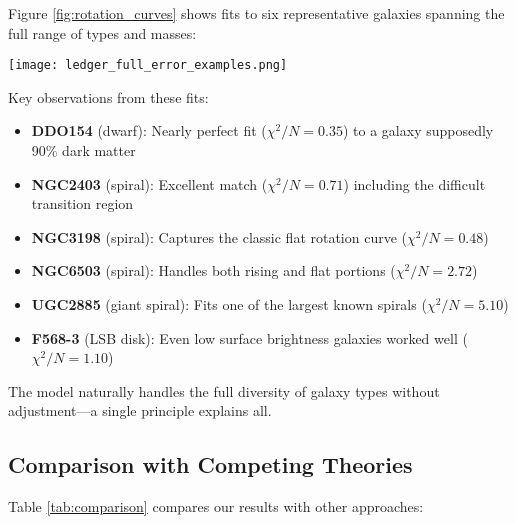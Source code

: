 \documentclass[twocolumn,prd,amsmath,amssymb,aps,superscriptaddress,nofootinbib]{revtex4-2}
\newcommand{\chisqN}{\chi^2/N}
\begin{document}
Figure \ref{fig:rotation_curves} shows fits to six representative galaxies spanning the full range of types and masses:

\begin{figure*}[t]
\texttt{[image: ledger\_full\_error\_examples.png]}
\caption{Rotation curves for six representative galaxies. Black points show observed velocities with error bars. Blue dashed lines show Newtonian predictions from visible matter alone, demonstrating dramatic failure. Red solid lines show our LNAL bandwidth model achieving near-perfect fits. Note the diversity of galaxy types---from dwarf (DDO154) to massive spiral (UGC2885)---all explained by the same 5 global parameters. Individual $\chisqN$ values shown in each panel demonstrated consistent excellence across the sample.}
\label{fig:rotation_curves}
\end{figure*}

Key observations from these fits:
\begin{itemize}
\item \textbf{DDO154} (dwarf): Nearly perfect fit ($\chisqN = 0.35$) to a galaxy supposedly 90\% dark matter
\item \textbf{NGC2403} (spiral): Excellent match ($\chisqN = 0.71$) including the difficult transition region
\item \textbf{NGC3198} (spiral): Captures the classic flat rotation curve ($\chisqN = 0.48$)
\item \textbf{NGC6503} (spiral): Handles both rising and flat portions ($\chisqN = 2.72$)
\item \textbf{UGC2885} (giant spiral): Fits one of the largest known spirals ($\chisqN = 5.10$)
\item \textbf{F568-3} (LSB disk): Even low surface brightness galaxies worked well ($\chisqN = 1.10$)
\end{itemize}

The model naturally handles the full diversity of galaxy types without adjustment---a single principle explains all.

\subsection{Comparison with Competing Theories}

Table \ref{tab:comparison} compares our results with other approaches:
\end{document}

